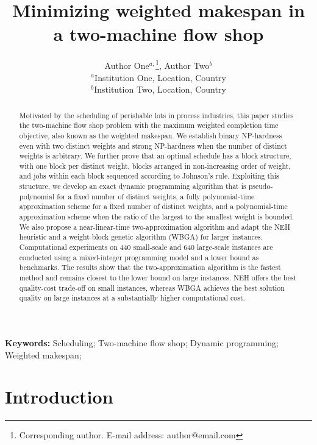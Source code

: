 ﻿\documentclass[12pt]{article} \textheight=24.5cm \textwidth=16.5cm \parskip = 0.165cm
\title{\LARGE\bf Minimizing weighted makespan in a two-machine flow shop}
\author{Author One$^{a,}$\footnote{Corresponding author. E-mail address: author@email.com}, Author Two$^{b}$\\
    {\small $^{a}$Institution One, Location, Country}\\
    {\small $^{b}$Institution Two, Location, Country}\\}
\date{}
\let\origsection\section
\renewcommand{\section}{\FloatBarrier\origsection}
\begin{document}
    \begin{sloppypar}

        \maketitle

        \begin{abstract}
        Motivated by the scheduling of perishable lots in process industries, this paper studies the two-machine flow shop problem with the maximum weighted completion time objective, also known as the weighted makespan.
        We establish binary NP-hardness even with two distinct weights and strong NP-hardness when the number of distinct weights is arbitrary. 
        We further prove that an optimal schedule has a block structure, with one block per distinct weight, blocks arranged in non-increasing order of weight, and jobs within each block sequenced according to Johnson's rule. 
        Exploiting this structure, we develop an exact dynamic programming algorithm that is pseudo-polynomial for a fixed number of distinct weights, a fully polynomial-time approximation scheme for a fixed number of distinct weights, and a polynomial-time approximation scheme when the ratio of the largest to the smallest weight is bounded. 
        We also propose a near-linear-time two-approximation algorithm and adapt the NEH heuristic and a weight-block genetic algorithm (WBGA) for larger instances. 
        Computational experiments on 440 small-scale and 640 large-scale instances are conducted using a mixed-integer programming model and a lower bound as benchmarks. 
        The results show that the two-approximation algorithm is the fastest method and remains closest to the lower bound on large instances. NEH offers the best quality-cost trade-off on small instances, whereas WBGA achieves the best solution quality on large instances at a substantially higher computational cost.
        \end{abstract}

        \noindent \textbf{Keywords:} Scheduling; Two-machine flow shop; Dynamic programming; Weighted makespan;

        \section{Introduction} \label{sec:intro}


\end{sloppypar}
\end{document}
